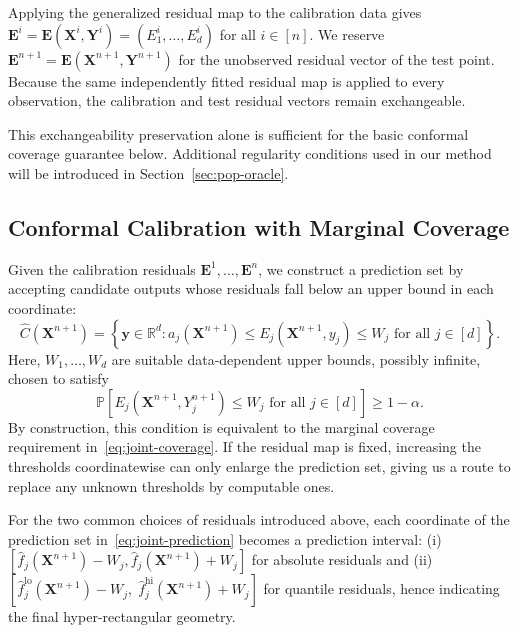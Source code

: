 Applying the generalized residual map to the calibration data gives $\mathbf E^i=\mathbf E(\mathbf X^i,\mathbf Y^i)=(E_1^i,\ldots,E_d^i)$ for all $i\in[n]$.
We reserve $\mathbf E^{n+1}=\mathbf E(\mathbf X^{n+1},\mathbf Y^{n+1})$ for the unobserved residual vector of the test point.
Because the same independently fitted residual map is applied to every observation, the calibration and test residual vectors remain exchangeable.

This exchangeability preservation alone is sufficient for the basic conformal coverage guarantee below. Additional regularity conditions used in our method will be introduced in Section~\ref{sec:pop-oracle}.

\subsection{Conformal Calibration with Marginal Coverage}
\label{sec:calibration}

Given the calibration residuals $\mathbf E^1,\ldots,\mathbf E^n$, we construct a prediction set by accepting candidate outputs whose residuals fall below an upper bound in each coordinate:
\begin{equation}
\hat C(\mathbf X^{n+1})
=
\left\{
\mathbf y\in\mathbb R^d:
a_j(\mathbf X^{n+1})
\leq E_j(\mathbf X^{n+1},y_j)\leq W_j
\text{ for all }j\in[d]
\right\}.
\label{eq:joint-prediction}
\end{equation}
Here, $W_1,\ldots,W_d$ are suitable data-dependent upper bounds, possibly infinite, chosen to satisfy
\begin{equation}
\mathbb P\!\left[
E_j(\mathbf X^{n+1},Y_j^{n+1})\leq W_j
\text{ for all }j\in[d]
\right]\geq1-\alpha.
\label{eq:coordinate-threshold}
\end{equation}
By construction, this condition is equivalent to the marginal coverage requirement in~\eqref{eq:joint-coverage}. If the residual map is fixed, increasing the thresholds coordinatewise can only enlarge the prediction set, giving us a route to replace any unknown thresholds by computable ones.

For the two common choices of residuals introduced above, each coordinate of the prediction set in~\eqref{eq:joint-prediction} becomes a prediction interval: (i) $\left[\hat f_j(\mathbf X^{n+1})-W_j,\hat f_j(\mathbf X^{n+1})+W_j\right]$ for absolute residuals and (ii)
$\left[
\hat f_j^{\mathrm{lo}}(\mathbf X^{n+1})-W_j,\;
\hat f_j^{\mathrm{hi}}(\mathbf X^{n+1})+W_j
\right]$
for quantile residuals, hence indicating the final hyper-rectangular geometry.


